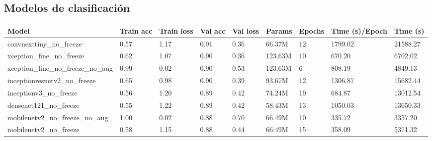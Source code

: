 \documentclass[10pt,a4paper,twocolumn,twoside]{article}
\begin{document}
\subsection{Modelos de clasificación}

\begin{table}[h]
  \centering
  \begin{tabular}{@{}lllllllll@{}}
  \toprule
  \textbf{Model}                      & \textbf{Train acc} & \textbf{Train loss} & \textbf{Val acc} & \textbf{Val loss} & \textbf{Params} & \textbf{Epochs} & \textbf{Time (s)/Epoch} & \textbf{Time (s)} \\
  \midrule
  convnexttiny\_no\_freeze            & 0.57                    & 1.17                & 0.91                  & 0.36              & 66.37M          & 12              & 1799.02                 & 21588.27          \\
  xception\_fine\_no\_freeze          & 0.62                    & 1.07                & 0.90                  & 0.36              & 123.63M         & 10              & 670.20                  & 6702.02           \\
  xception\_fine\_no\_freeze\_no\_aug & 0.99                    & 0.02                & 0.90                  & 0.53              & 123.63M         & 6               & 808.19                  & 4849.13           \\
  inceptionresnetv2\_no\_freeze       & 0.65                    & 0.98                & 0.90                  & 0.39              & 93.67M          & 12              & 1306.87                 & 15682.44          \\
  inceptionv3\_no\_freeze             & 0.56                    & 1.20                & 0.89                  & 0.42              & 74.24M          & 19              & 684.87                  & 13012.54          \\
  densenet121\_no\_freeze             & 0.55                    & 1.22                & 0.89                  & 0.42              & 58.43M          & 13              & 1050.03                 & 13650.33          \\
  mobilenetv2\_no\_freeze\_no\_aug    & 1.00                    & 0.02                & 0.88                  & 0.70              & 66.49M          & 10              & 335.72                  & 3357.20           \\
  mobilenetv2\_no\_freeze             & 0.58                    & 1.15                & 0.88                  & 0.44              & 66.49M          & 15              & 358.09                  & 5371.32           \\

\end{tabular}
\end{table}
\end{document}
